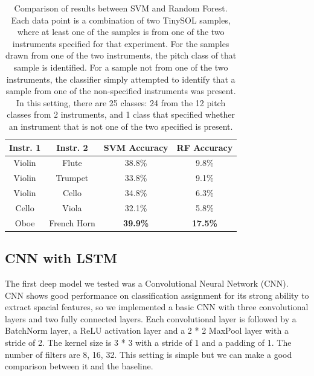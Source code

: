 \documentclass{article}
\begin{document}
\begin{table}
  \begin{center}
    \label{tab:table1}
    \begin{tabular}{|c|c|c|c|} 
    	  \hline
      \textbf{Instr. 1} & \textbf{Instr. 2} & \textbf{SVM Accuracy} & \textbf{RF Accuracy}\\
      \hline
      Violin & Flute & 38.8\% & 9.8\% \\
      \hline
      Violin & Trumpet & 33.8\% & 9.1\% \\
      \hline
      Violin & Cello & 34.8\% & 6.3\% \\
      \hline
      Cello & Viola & 32.1\% & 5.8\% \\
      \hline
      Oboe & French Horn & \textbf{39.9\%} & \textbf{17.5\%} \\
      \hline
    \end{tabular}
  \end{center}
  \caption{Comparison of results between SVM and Random Forest. Each data point is a combination of two TinySOL samples, where at least one of the samples is from one of the two instruments specified for that experiment. For the samples drawn from one of the two instruments, the pitch class of that sample is identified. For a sample not from one of the two instruments, the classifier simply attempted to identify that a sample from one of the non-specified instruments was present. In this setting, there are 25 classes: 24 from the 12 pitch classes from 2 instruments, and 1 class that specified whether an instrument that is not one of the two specified is present.}
\end{table}


\subsection{CNN with LSTM}

The first deep model we tested was a Convolutional Neural Network (CNN). CNN shows good performance on classification assignment for its strong ability to extract spacial features, so we implemented a basic CNN with three convolutional layers and two fully connected layers. Each convolutional layer is followed by a BatchNorm layer, a ReLU activation layer and a 2 * 2  MaxPool layer with a stride of 2. The kernel size is 3 * 3 with a stride of 1 and a padding of 1. The number of filters are 8, 16, 32. This setting is simple but we can make a good comparison between it and the baseline. \\
\end{document}
